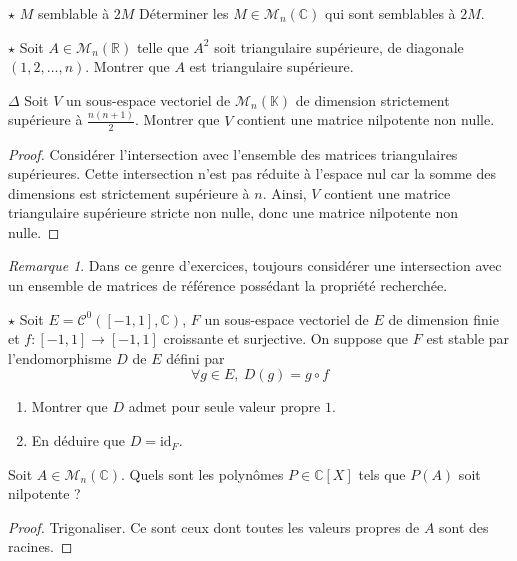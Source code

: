 \documentclass[french,a4paper]{article}
\newcommand{\R}{\mathbb{R}}
\newcommand{\C}{\mathbb{C}}
\newcommand{\K}{\mathbb{K}}
\theoremstyle{plain}
\theoremstyle{definition}
\theoremstyle{remark}
\newtheorem*{rmq}{Remarque}
\begin{document}
\begin{ex}[Châteaux]{$\star$ $M$ semblable à $2M$}
	Déterminer les $M\in\mathcal{M}_n(\C)$ qui sont semblables à $2M$.
\end{ex}

\begin{ex}[Châteaux]{$\star$}
	Soit $A\in\mathcal{M}_n(\R)$ telle que $A^2$ soit triangulaire supérieure, de diagonale $(1,2,\ldots,n)$. Montrer que $A$ est triangulaire supérieure.
\end{ex}

\begin{ex}{$\Delta$}
	Soit $V$ un sous-espace vectoriel de $\mathcal{M}_n(\K)$ de dimension strictement supérieure à $\displaystyle\frac{n(n+1)}{2}$. Montrer que $V$ contient une matrice nilpotente non nulle.
\end{ex}
\begin{proof}
	Considérer l'intersection avec l'ensemble des matrices triangulaires supérieures. Cette intersection n'est pas réduite à l'espace nul car la somme des dimensions est strictement supérieure à $n$. Ainsi, $V$ contient une matrice triangulaire supérieure stricte non nulle, donc une matrice nilpotente non nulle.
\end{proof}
\begin{rmq}
	Dans ce genre d'exercices, toujours considérer une intersection avec un ensemble de matrices de référence possédant la propriété recherchée.
\end{rmq}

\begin{ex}{$\star$}
	Soit $E=\mathcal{C}^0([-1,1],\C)$, $F$ un sous-espace vectoriel de $E$ de dimension finie et $f:[-1,1]\to[-1,1]$ croissante et surjective. On suppose que $F$ est stable par l'endomorphisme $D$ de $E$ défini par $$\forall g\in E,\ D(g)=g\circ f$$
	\begin{enumerate}
		\item Montrer que $D$ admet pour seule valeur propre $1$.
		\item En déduire que $D=\text{id}_F$.
	\end{enumerate}
\end{ex}

\begin{ex}{}
	Soit $A\in\mathcal{M}_n(\C)$. Quels sont les polynômes $P\in\C[X]$ tels que $P(A)$ soit nilpotente ?
\end{ex}
\begin{proof}
	Trigonaliser. Ce sont ceux dont toutes les valeurs propres de $A$ sont des racines.
\end{proof}
\end{document}
